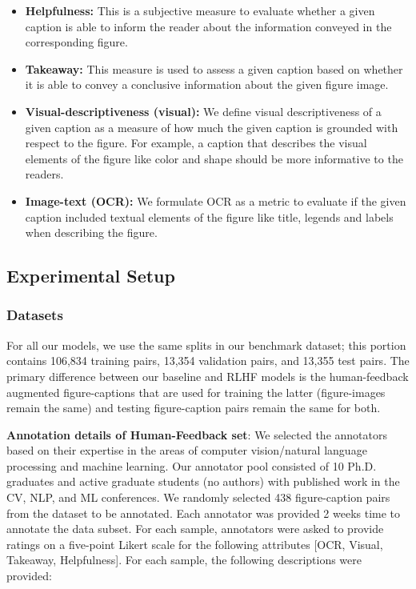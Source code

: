 \documentclass[11pt]{article}
\begin{document}
\begin{itemize}
    \item \textbf{Helpfulness:} This is a subjective measure to evaluate whether a given caption is able to inform the reader about the information conveyed in the corresponding figure.
    \item \textbf{Takeaway:} This measure is used to assess a given caption based on whether it is able to convey a conclusive information about the given figure image. 
    \item \textbf{Visual-descriptiveness (visual):} We define visual descriptiveness of a given caption as a measure of how much the given caption is grounded with respect to the figure. For example, a caption that describes the visual elements of the figure like color and shape should be more informative to the readers.
    \item \textbf{Image-text (OCR):} We formulate OCR as a metric to evaluate if the given caption included textual elements of the figure like title, legends and labels when describing the figure.
\end{itemize}

\subsection{Experimental Setup}

\subsubsection{Datasets}
\label{sec:data}
For all our models, we use the same splits in our benchmark dataset; this portion contains 106,834 training pairs, 13,354 validation pairs, and 13,355 test pairs. The primary difference between our baseline and RLHF models is the human-feedback augmented figure-captions that are used for training the latter (figure-images remain the same) and testing figure-caption pairs remain the same for both.

\textbf{Annotation details of Human-Feedback set}: 
We selected the annotators based on their expertise in the areas of computer vision/natural language processing and machine learning. Our annotator pool consisted of 10 Ph.D. graduates and active graduate students (no authors) with published work in the CV, NLP, and ML conferences. We randomly selected 438 figure-caption pairs from the dataset to be annotated. Each annotator was provided 2 weeks time to annotate the data subset. For each sample, annotators were asked to provide ratings on a five-point Likert scale for the following attributes [OCR, Visual, Takeaway, Helpfulness]. For each sample, the following descriptions were provided:
\end{document}
